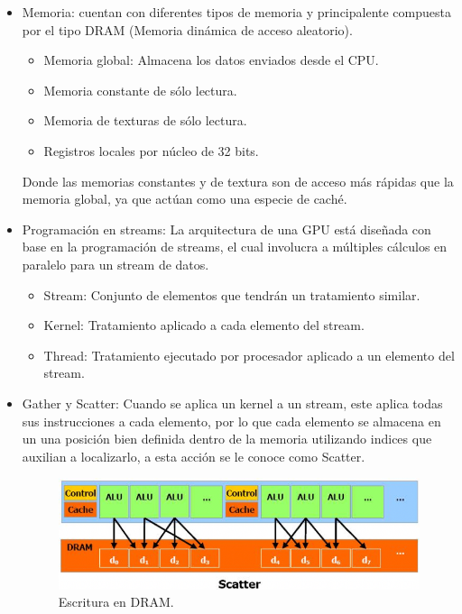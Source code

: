 \begin{itemize}
\item Memoria: cuentan con diferentes tipos de memoria y principalente compuesta por el tipo DRAM (Memoria dinámica de acceso aleatorio).
	\begin{itemize}
	\item Memoria global: Almacena los datos enviados desde el CPU.
	\item Memoria constante de sólo lectura.
	\item Memoria de texturas de sólo lectura.
	\item Registros locales por núcleo de 32 bits. 
	\end{itemize}
Donde las memorias constantes y de textura son de acceso más rápidas que la memoria global, ya que actúan como una especie de caché.

\item Programación en streams: La arquitectura de una GPU está diseñada con base en la programación de streams, el cual involucra a múltiples cálculos en paralelo para un stream de datos\cite{stream}. 

	\begin{itemize}
	\item Stream: Conjunto de elementos que tendrán un tratamiento similar.
	\item Kernel: Tratamiento aplicado a cada elemento del stream.
	\item Thread: Tratamiento ejecutado por procesador aplicado a un elemento del stream.
	\end{itemize} 
	
\item Gather y Scatter: Cuando se aplica un kernel a un stream, este aplica todas sus instrucciones a cada elemento, por lo que cada elemento se almacena en un una posición bien definida dentro de la memoria utilizando indices que auxilian a localizarlo, a esta acción se le conoce como Scatter. 

        \begin{figure}[ht]
      \centering
        \includegraphics[scale=1]{img/scatter}
        \caption{Escritura en DRAM\cite{NCUDA}.}
        \label{fig:scatter}
    \end{figure}
   

\end{itemize}
